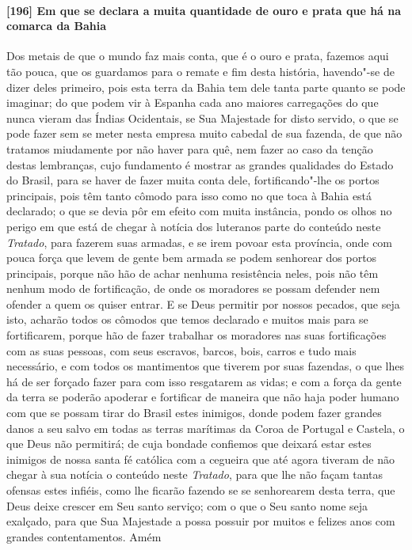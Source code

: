 \paragraph{[196] Em que se declara a muita quantidade de ouro e prata que há na comarca da
Bahia}\quad
Dos metais de que o mundo faz mais conta, que é o ouro e prata, fazemos aqui tão pouca,
que os guardamos para o remate e fim desta história, havendo"-se de dizer deles primeiro,
pois esta terra da Bahia tem dele tanta parte quanto se pode imaginar; do que podem vir à
Espanha cada ano maiores carregações do que nunca vieram das Índias Ocidentais, se Sua
Majestade for disto servido, o que se pode fazer sem se meter nesta empresa muito cabedal
de sua fazenda, de que não tratamos miudamente por não haver para quê, nem fazer ao caso
da tenção destas lembranças, cujo fundamento é mostrar as grandes qualidades do Estado do
Brasil, para se haver de fazer muita conta dele, fortificando"-lhe os portos principais,
pois têm tanto cômodo para isso como no que toca à Bahia está declarado; o que se devia
pôr em efeito com muita instância, pondo os olhos no perigo em que está de chegar à
notícia dos luteranos parte do conteúdo neste \textit{Tratado}, para fazerem suas armadas,
e se irem povoar esta província, onde com pouca força que levem de gente bem armada se
podem senhorear dos portos principais, porque não hão de achar nenhuma resistência neles,
pois não têm nenhum modo de fortificação, de onde os moradores se possam defender nem
ofender a quem os quiser entrar. E se Deus permitir por nossos pecados, que seja isto,
acharão todos os cômodos que temos declarado e muitos mais para se fortificarem, porque
hão de fazer trabalhar os moradores nas suas fortificações com as suas pessoas, com seus
escravos, barcos, bois, carros e tudo mais necessário, e com todos os mantimentos que
tiverem por suas fazendas, o que lhes há de ser forçado fazer para com isso resgatarem as
vidas; e com a força da gente da terra se poderão apoderar e fortificar de maneira que não
haja poder humano com que se possam tirar do Brasil estes inimigos, donde podem fazer
grandes danos a seu salvo em todas as terras marítimas da Coroa de Portugal e Castela, o
que Deus não permitirá; de cuja bondade confiemos que deixará estar estes inimigos de
nossa santa fé católica com a cegueira que até agora tiveram de não chegar à sua notícia o
conteúdo neste \textit{Tratado}, para que lhe não façam tantas ofensas estes infiéis, como
lhe ficarão fazendo se se senhorearem desta terra, que Deus deixe crescer em Seu santo
serviço; com o que o Seu santo nome seja exalçado, para que Sua Majestade a possa possuir
por muitos e felizes anos com grandes contentamentos. Amém

